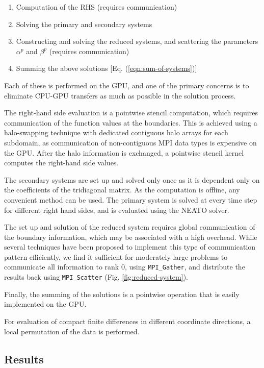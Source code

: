 \documentclass{elsarticle}
\begin{document}
\begin{enumerate}
\item Computation of the RHS (requires communication)
\item Solving the primary and secondary systems
\item Constructing and solving the reduced systems,
    and scattering the parameters $\alpha^p$ and $\beta^p$ (requires communication)
\item Summing the above solutions [Eq. (\ref{eqn:sum-of-systems})]
\end{enumerate}

Each of these is performed on the GPU,
and one of the primary concerns is to eliminate
CPU-GPU transfers as much as possible in the solution process.

The right-hand side evaluation is a pointwise stencil computation,
which requires communication of the function values at the boundaries.
This is achieved using a halo-swapping technique
with dedicated contiguous halo arrays for each subdomain,
as communication of non-contiguous MPI
data types is expensive on the GPU.
After the halo information is exchanged,
a pointwise stencil kernel computes the right-hand side values.

The secondary systems are set up and solved only once
as it is dependent only on the
coefficients of the tridiagonal matrix.
As the computation is offline,
any convenient method can be used.
The primary system is solved at every time step
for different right hand sides,
and is evaluated using the NEATO solver.

The set up and solution of the reduced system
requires global communication of the boundary information,
which may be associated with a high overhead.
While several techniques have been proposed to implement
this type of communication pattern efficiently,
we find it sufficient for moderately large problems
to communicate all information to rank 0,
using \texttt{MPI\_Gather}, and distribute the results
back using \texttt{MPI\_Scatter} (Fig. \ref{fig:reduced-system}).

Finally, the summing of the solutions
is a pointwise operation that is easily implemented
on the GPU.

For evaluation of compact finite differences in different
coordinate directions,
a local permutation of the data is performed.

\subsection{Results}
\end{document}
